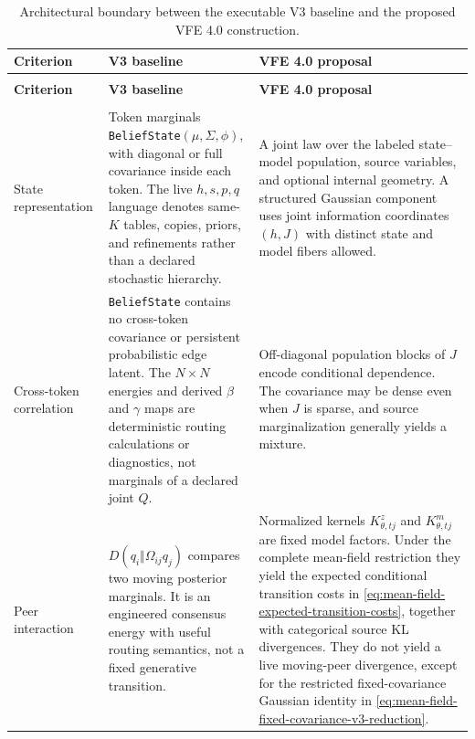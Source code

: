 \begin{longtable}{>{\raggedright\arraybackslash}p{} >{\raggedright\arraybackslash}p{} >{\raggedright\arraybackslash}p{}}
\caption{Architectural boundary between the executable V3 baseline and the proposed VFE 4.0 construction.}
\label{tab:v3-v4-crosswalk}\\
\toprule
\textbf{Criterion} & \textbf{V3 baseline} & \textbf{VFE 4.0 proposal} \\
\midrule
\endfirsthead
\multicolumn{3}{c}{\tablename\ \thetable\ continued}\\
\toprule
\textbf{Criterion} & \textbf{V3 baseline} & \textbf{VFE 4.0 proposal} \\
\midrule
\endhead
\midrule
\multicolumn{3}{r}{Continued on the next page}\\
\endfoot
\bottomrule
\endlastfoot
State representation
& Token marginals \texttt{BeliefState}$(\mu,\Sigma,\phi)$, with diagonal or full covariance inside each token. The live $h,s,p,q$ language denotes same-$K$ tables, copies, priors, and refinements rather than a declared stochastic hierarchy.
& A joint law over the labeled state--model population, source variables, and optional internal geometry. A structured Gaussian component uses joint information coordinates $(h,J)$ with distinct state and model fibers allowed. \\
\addlinespace
Cross-token correlation
& \texttt{BeliefState} contains no cross-token covariance or persistent probabilistic edge latent. The $N\times N$ energies and derived $\beta$ and $\gamma$ maps are deterministic routing calculations or diagnostics, not marginals of a declared joint $Q$.
& Off-diagonal population blocks of $J$ encode conditional dependence. The covariance may be dense even when $J$ is sparse, and source marginalization generally yields a mixture. \\
\addlinespace
Peer interaction
& $D(q_i\Vert\Omega_{ij}q_j)$ compares two moving posterior marginals. It is an engineered consensus energy with useful routing semantics, not a fixed generative transition.
& Normalized kernels $K^z_{\theta,tj}$ and $K^m_{\theta,tj}$ are fixed model factors. Under the complete mean-field restriction they yield the expected conditional transition costs in \cref{eq:mean-field-expected-transition-costs}, together with categorical source KL divergences. They do not yield a live moving-peer divergence, except for the restricted fixed-covariance Gaussian identity in \cref{eq:mean-field-fixed-covariance-v3-reduction}. \\

\end{longtable}
